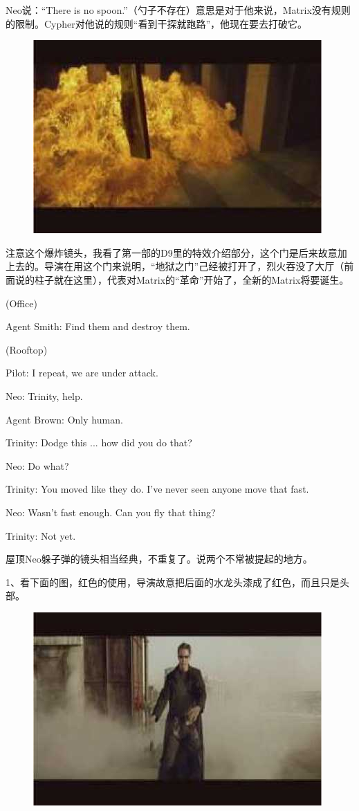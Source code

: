 \documentclass{ctexart}
\newenvironment{myquote}{\color{green} \setlength{\leftskip}{6em} \setlength{\rightskip}{4em} \setlength{\parindent}{-2em}}{\par}
\begin{document}
Neo说：“There is no spoon.”（勺子不存在）意思是对于他来说，Matrix没有规则的限制。Cypher对他说的规则“看到干探就跑路”，他现在要去打破它。

\begin{figure}[htb]
\centering
\includegraphics[width=0.5\linewidth]{fig/read_Matrix-65}
\end{figure}

注意这个爆炸镜头，我看了第一部的D9里的特效介绍部分，这个门是后来故意加上去的。导演在用这个门来说明，“地狱之门”己经被打开了，烈火吞没了大厅（前面说的柱子就在这里），代表对Matrix的“革命”开始了，全新的Matrix将要诞生。

\begin{myquote}
(Office)

Agent Smith: Find them and destroy them.

(Rooftop)

Pilot: I repeat, we are under attack.

Neo: Trinity, help.

Agent Brown: Only human.

Trinity: Dodge this ... how did you do that?

Neo: Do what?

Trinity: You moved like they do. I've never seen anyone move that fast.

Neo: Wasn't fast enough. Can you fly that thing?

Trinity: Not yet.
\end{myquote}

屋顶Neo躲子弹的镜头相当经典，不重复了。说两个不常被提起的地方。

1、看下面的图，红色的使用，导演故意把后面的水龙头漆成了红色，而且只是头部。

\begin{figure}[htb]
\centering
\includegraphics[width=0.5\linewidth]{fig/read_Matrix-66}
\end{figure}
\end{document}
